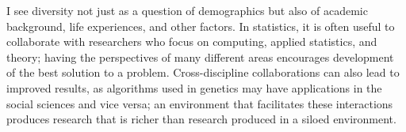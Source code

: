 \documentclass[12pt, letterpaper, sans]{moderncv}
\begin{document}
I see diversity not just as a question of demographics but also of academic background, life experiences, and other factors. In statistics, it is often useful to collaborate with researchers who focus on computing, applied statistics, and theory; having the perspectives of many different areas encourages development of the best solution to a problem. Cross-discipline collaborations can also lead to improved results, as algorithms used in genetics may have applications in the social sciences and vice versa; an environment that facilitates these interactions produces research that is richer than research produced in a siloed environment. 
 
\end{document}
